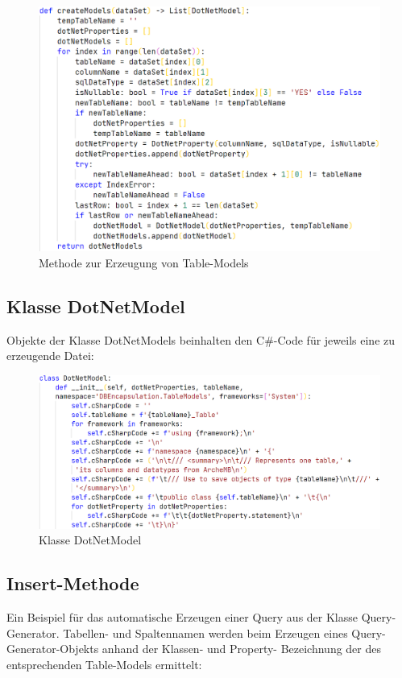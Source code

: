 \documentclass[11pt,toc=sectionentrywithoutdots, 
headheight=44pt, headings=optiontoheadandtoc, hyperfootnotes=false, hypertexnames=false]{scrartcl}
\begin{document}
 \begin{figure}[H]
 \centering

	\includegraphics[scale=0.6]{modelGenerierung.PNG}
	 \caption{Methode zur Erzeugung von Table-Models}
 \end{figure}
 \clearpage
 
  \subsection{Klasse DotNetModel}
Objekte der Klasse DotNetModels beinhalten den C\#-Code für jeweils eine zu erzeugende Datei:
 \label{fig:DotNetModel}

 \begin{figure}[H]
 \centering

	\includegraphics[scale=0.55]{dotNetModel.PNG}
	 \caption{Klasse DotNetModel}
 \end{figure}
 \clearpage
 
   \subsection{Insert-Methode}
Ein Beispiel für das automatische Erzeugen einer Query aus der Klasse Query-Generator. Tabellen- und Spaltennamen werden beim Erzeugen eines Query-Generator-Objekts anhand der Klassen- und Property- Bezeichnung der des entsprechenden Table-Models ermittelt:
 \label{fig:Insert-Methode}
\end{document}
